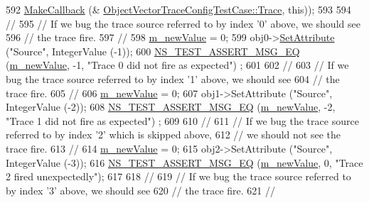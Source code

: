 \begin{DoxyCode}
592                                  \hyperlink{group__makecallbackmemptr_ga9376283685aa99d204048d6a4b7610a4}{MakeCallback} (&
      \hyperlink{classObjectVectorTraceConfigTestCase_a53ffa913f088d92e66612308f6b505da}{ObjectVectorTraceConfigTestCase::Trace}, \textcolor{keyword}{this}));
593 
594   \textcolor{comment}{// }
595   \textcolor{comment}{// If we bug the trace source referred to by index '0' above, we should see }
596   \textcolor{comment}{// the trace fire.}
597   \textcolor{comment}{//}
598   \hyperlink{classObjectVectorTraceConfigTestCase_aa09d9661bd785bbeb9db030419138e5f}{m\_newValue} = 0;
599   obj0->\hyperlink{classns3_1_1ObjectBase_ac60245d3ea4123bbc9b1d391f1f6592f}{SetAttribute} (\textcolor{stringliteral}{"Source"}, IntegerValue (-1));
600   \hyperlink{group__testing_ga2a9d78cffb3db8e867c35fff0b698cf5}{NS\_TEST\_ASSERT\_MSG\_EQ} (\hyperlink{classObjectVectorTraceConfigTestCase_aa09d9661bd785bbeb9db030419138e5f}{m\_newValue}, -1, \textcolor{stringliteral}{"Trace 0 did not fire as expected"})
      ;
601 
602   \textcolor{comment}{// }
603   \textcolor{comment}{// If we bug the trace source referred to by index '1' above, we should see }
604   \textcolor{comment}{// the trace fire.}
605   \textcolor{comment}{//}
606   \hyperlink{classObjectVectorTraceConfigTestCase_aa09d9661bd785bbeb9db030419138e5f}{m\_newValue} = 0;
607   obj1->SetAttribute (\textcolor{stringliteral}{"Source"}, IntegerValue (-2));
608   \hyperlink{group__testing_ga2a9d78cffb3db8e867c35fff0b698cf5}{NS\_TEST\_ASSERT\_MSG\_EQ} (\hyperlink{classObjectVectorTraceConfigTestCase_aa09d9661bd785bbeb9db030419138e5f}{m\_newValue}, -2, \textcolor{stringliteral}{"Trace 1 did not fire as expected"})
      ;
609 
610   \textcolor{comment}{// }
611   \textcolor{comment}{// If we bug the trace source referred to by index '2' which is skipped above,}
612   \textcolor{comment}{// we should not see the trace fire.}
613   \textcolor{comment}{//}
614   \hyperlink{classObjectVectorTraceConfigTestCase_aa09d9661bd785bbeb9db030419138e5f}{m\_newValue} = 0;
615   obj2->SetAttribute (\textcolor{stringliteral}{"Source"}, IntegerValue (-3));
616   \hyperlink{group__testing_ga2a9d78cffb3db8e867c35fff0b698cf5}{NS\_TEST\_ASSERT\_MSG\_EQ} (\hyperlink{classObjectVectorTraceConfigTestCase_aa09d9661bd785bbeb9db030419138e5f}{m\_newValue}, 0, \textcolor{stringliteral}{"Trace 2 fired unexpectedly"});
617 
618   \textcolor{comment}{// }
619   \textcolor{comment}{// If we bug the trace source referred to by index '3' above, we should see }
620   \textcolor{comment}{// the trace fire.}
621   \textcolor{comment}{//}

\end{DoxyCode}

